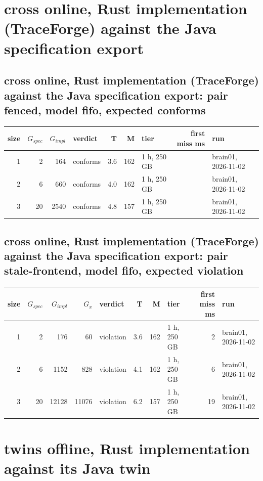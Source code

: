 \documentclass[10pt]{article}
\begin{document}
\section*{cross online, Rust implementation (TraceForge) against the Java specification export}
\subsection*{cross online, Rust implementation (TraceForge) against the Java specification export: pair \textsf{fenced}, model fifo, expected conforms}
\begin{longtable}{@{}rrrlrrlrl@{}}
\toprule
size & $G_{\mathit{spec}}$ & $G_{\mathit{impl}}$ & verdict & T & M & tier & first miss ms & run \\
\midrule
\endhead
\color{red} 1 & 2 & 164 & conforms & 3.6 & 162 & 1 h, 250 GB &  & brain01, 2026-11-02 \\
\color{red} 2 & 6 & 660 & conforms & 4.0 & 162 & 1 h, 250 GB &  & brain01, 2026-11-02 \\
\color{red} 3 & 20 & 2540 & conforms & 4.8 & 157 & 1 h, 250 GB &  & brain01, 2026-11-02 \\
\bottomrule
\end{longtable}
\subsection*{cross online, Rust implementation (TraceForge) against the Java specification export: pair \textsf{stale-frontend}, model fifo, expected violation}
\begin{longtable}{@{}rrrrlrrlrl@{}}
\toprule
size & $G_{\mathit{spec}}$ & $G_{\mathit{impl}}$ & $G_x$ & verdict & T & M & tier & first miss ms & run \\
\midrule
\endhead
\color{red} 1 & 2 & 176 & 60 & violation & 3.6 & 162 & 1 h, 250 GB & 2 & brain01, 2026-11-02 \\
\color{red} 2 & 6 & 1152 & 828 & violation & 4.1 & 162 & 1 h, 250 GB & 6 & brain01, 2026-11-02 \\
\color{red} 3 & 20 & 12128 & 11076 & violation & 6.2 & 157 & 1 h, 250 GB & 19 & brain01, 2026-11-02 \\
\bottomrule
\end{longtable}
\section*{twins offline, Rust implementation against its Java twin}
\end{document}
